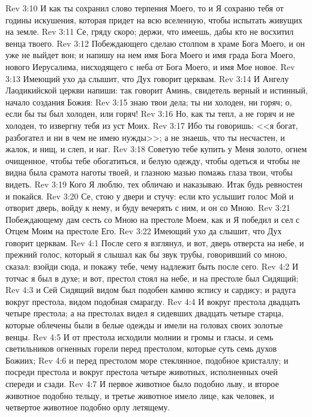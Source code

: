 \vs Rev 3:10 И как ты сохранил слово терпения Моего, то и Я сохраню тебя от годины искушения, которая придет на всю вселенную, чтобы испытать живущих на земле.
\vs Rev 3:11 Се, гряду скоро; держи, что имеешь, дабы кто не восхитил венца твоего.
\vs Rev 3:12 Побеждающего сделаю столпом в храме Бога Моего, и он уже не выйдет вон; и напишу на нем имя Бога Моего и имя града Бога Моего, нового Иерусалима, нисходящего с неба от Бога Моего, и имя Мое новое.
\vs Rev 3:13 Имеющий ухо да слышит, что Дух говорит церквам.
\rsbpar\vs Rev 3:14 И Ангелу Лаодикийской церкви напиши: так говорит Аминь, свидетель верный и истинный, начало создания Божия:
\vs Rev 3:15 знаю твои дела; ты ни холоден, ни горяч; о, если бы ты был холоден, или горяч!
\vs Rev 3:16 Но, как ты тепл, а не горяч и не холоден, то извергну тебя из уст Моих.
\vs Rev 3:17 Ибо ты говоришь: <<я богат, разбогател и ни в чем не имею нужды>>; а не знаешь, что ты несчастен, и жалок, и нищ, и слеп, и наг.
\vs Rev 3:18 Советую тебе купить у Меня золото, огнем очищенное, чтобы тебе обогатиться, и белую одежду, чтобы одеться и чтобы не видна была срамота наготы твоей, и глазною мазью помажь глаза твои, чтобы видеть.
\vs Rev 3:19 Кого Я люблю, тех обличаю и наказываю. Итак будь ревностен и покайся.
\vs Rev 3:20 Се, стою у двери и стучу: если кто услышит голос Мой и отворит дверь, войду к нему, и буду вечерять с ним, и он со Мною.
\vs Rev 3:21 Побеждающему дам сесть со Мною на престоле Моем, как и Я победил и сел с Отцем Моим на престоле Его.
\vs Rev 3:22 Имеющий ухо да слышит, что Дух говорит церквам.
\vs Rev 4:1 После сего я взглянул, и вот, дверь отверста на небе, и прежний голос, который я слышал как бы звук трубы, говоривший со мною, сказал: взойди сюда, и покажу тебе, чему надлежит быть после сего.
\vs Rev 4:2 И тотчас я был в духе; и вот, престол стоял на небе, и на престоле был Сидящий;
\vs Rev 4:3 и Сей Сидящий видом был подобен камню яспису и сардису; и радуга вокруг престола, видом подобная смарагду.
\vs Rev 4:4 И вокруг престола двадцать четыре престола; а на престолах видел я сидевших двадцать четыре старца, которые облечены были в белые одежды и имели на головах своих золотые венцы.
\vs Rev 4:5 И от престола исходили молнии и громы и гласы, и семь светильников огненных горели перед престолом, которые суть семь духов Божиих;
\vs Rev 4:6 и перед престолом море стеклянное, подобное кристаллу; и посреди престола и вокруг престола четыре животных, исполненных очей спереди и сзади.
\vs Rev 4:7 И первое животное было подобно льву, и второе животное подобно тельцу, и третье животное имело лице, как человек, и четвертое животное подобно орлу летящему.
